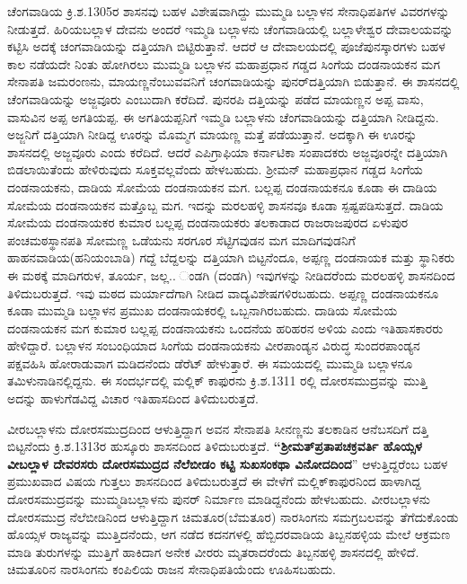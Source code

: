 ಚೆಂಗವಾಡಿಯ ಕ್ರಿ.ಶ.1305ರ ಶಾಸನವು ಬಹಳ ವಿಶೇಷವಾಗಿದ್ದು ಮುಮ್ಮಡಿ ಬಲ್ಲಾಳನ ಸೇನಾಧಿಪತಿಗಳ ವಿವರಗಳನ್ನು ನೀಡುತ್ತದೆ. ಹಿರಿಯಬಲ್ಲಾಳ ದೇವನು ಅಂದರೆ ಇಮ್ಮಡಿ ಬಲ್ಲಾಳನು ಚೆಂಗವಾಡಿಯಲ್ಲಿ ಬಲ್ಲಾಳೇಶ್ವರ ದೇವಾಲಯವನ್ನು ಕಟ್ಟಿಸಿ ಅದಕ್ಕೆ ಚಂಗವಾಡಿಯನ್ನು ದತ್ತಿಯಾಗಿ ಬಿಟ್ಟಿರುತ್ತಾನೆ. ಆದರೆ ಆ ದೇವಾಲಯದಲ್ಲಿ ಪೂಜೆಪುನಸ್ಕಾರಗಳು ಬಹಳ ಕಾಲ ನಡೆಯದೇ ನಿಂತು ಹೋಗಿರಲು ಮುಮ್ಮಡಿ ಬಲ್ಲಾಳನ ಮಹಾಪ್ರಧಾನ ಗಡ್ಡದ ಸಿಂಗೆಯ ದಂಡನಾಯಕನ ಮಗ ಸೇನಾಪತಿ ಜಮರಂಣನು, ಮಾಯಣ್ಣನೆಂಬುವವನಿಗೆ ಚಂಗವಾಡಿಯನ್ನು ಪುನರ್​ದತ್ತಿಯಾಗಿ ಬಿಡುತ್ತಾನೆ. ಈ ಶಾಸನದಲ್ಲಿ ಚೆಂಗವಾಡಿಯನ್ನು ಅಜ್ಜವೂರು ಎಂಬುದಾಗಿ ಕರೆದಿದೆ. ಪುನರಪಿ ದತ್ತಿಯನ್ನು ಪಡೆದ ಮಾಯಣ್ಣನ ಅಪ್ಪ ವಾಸು, ವಾಸುವಿನ ಅಪ್ಪ ಅಗತಿಯಪ್ಪ. ಈ ಅಗತಿಯಪ್ಪನಿಗೆ ಇಮ್ಮಡಿ ಬಲ್ಲಾಳನು ಚೆಂಗವಾಡಿಯನ್ನು ದತ್ತಿಯಾಗಿ ನೀಡಿದ್ದನು. ಅಜ್ಜನಿಗೆ ದತ್ತಿಯಾಗಿ ನೀಡಿದ್ದ ಊರನ್ನು ಮೊಮ್ಮಗ ಮಾಯಣ್ಣ ಮತ್ತೆ ಪಡೆಯುತ್ತಾನೆ. ಅದಕ್ಕಾಗಿ ಈ ಊರನ್ನು ಶಾಸನದಲ್ಲಿ ಅಜ್ಜವೂರು ಎಂದು ಕರೆದಿದೆ. ಆದರೆ ಎಪಿಗ್ರಾಫಿಯಾ ಕರ್ನಾಟಿಕಾ ಸಂಪಾದಕರು ಅಜ್ಜವೂರನ್ನೇ ದತ್ತಿಯಾಗಿ ಬಿಡಲಾಯಿತೆಂದು ಹೇಳಿರುವುದು ಸೂಕ್ತವಲ್ಲವೆಂದು ಹೇಳಬಹುದು. ಶ‍್ರೀಮನ್​ ಮಹಾಪ್ರಧಾನ ಗಡ್ಡದ ಸಿಂಗೆಯ ದಂಡನಾಯಕನು, ದಾಡಿಯ ಸೋಮೆಯ ದಂಡನಾಯಕನ ಮಗ. ಬಲ್ಲಪ್ಪ ದಂಡನಾಯಕನೂ ಕೂಡಾ ಈ ದಾಡಿಯ ಸೋಮೆಯ ದಂಡನಾಯಕನ ಮತ್ತೊಬ್ಬ ಮಗ. ಇದನ್ನು ಮರಲಹಳ್ಳಿ ಶಾಸನವೂ ಕೂಡಾ ಸ್ಪಷ್ಟಪಡಿಸುತ್ತದೆ.  ದಾಡಿಯ ಸೋಮೆಯ ದಂಡನಾಯಕರ ಕುಮಾರ ಬಲ್ಲಪ್ಪ ದಂಡನಾಯಕರು ತಲಕಾಡಾದ ರಾಜರಾಜಪುರದ ಏಳುಪುರ ಪಂಚಮಠಸ್ಥಾನಪತಿ ಸೋಮಣ್ಣ ಒಡೆಯನು ಸರಗೂರ ಸೆಟ್ಟಿಗವುಡನ ಮಗ ಮಾದಿಗವುಡನಿಗೆ ಹಾಹನವಾಡಿಯ(ಹನಿಯಂಬಾಡಿ) ಗದ್ದೆ ಬೆದ್ದಲನ್ನು ದತ್ತಿಯಾಗಿ ಬಿಟ್ಟನೆಂದೂ, ಅಪ್ಪಣ್ಣ ದಂಡನಾಯಕ ಮತ್ತು ಸ್ಥಾನಿಕರು ಈ ಮಠಕ್ಕೆ ಮಾದಿಗರುಳ, ತೂರ್ಯ, ಜಲ್ಲ.. ಂಡಗಿ (ದಂಡಗಿ) ಇವುಗಳನ್ನು ನೀಡಿದರೆಂದು ಮರಲಹಳ್ಳಿ ಶಾಸನದಿಂದ ತಿಳಿದುಬರುತ್ತದೆ. ಇವು ಮಠದ ಮರ್ಯಾದೆಗಾಗಿ ನೀಡಿದ ವಾದ್ಯವಿಶೇಷಗಳಿರಬಹುದು. ಅಪ್ಪಣ್ಣ ದಂಡನಾಯಕನೂ ಕೂಡಾ ಮುಮ್ಮಡಿ ಬಲ್ಲಾಳನ ಪ್ರಮುಖ ದಂಡನಾಯಕರಲ್ಲಿ ಒಬ್ಬನಾಗಿರಬಹುದು. ದಾಡಿಯ ಸೋಮೆಯ ದಂಡನಾಯಕನ ಮಗ ಕುಮಾರ ಬಲ್ಲಪ್ಪ ದಂಡನಾಯಕನು ಒಂದನೆಯ ಹರಿಹರನ ಅಳಿಯ ಎಂದು ಇತಿಹಾಸಕಾರರು ಹೇಳಿದ್ದಾರೆ. ಬಲ್ಲಾಳನ ಸಂಬಂಧಿಯಾದ ಸಿಂಗೆಯ ದಂಡನಾಯಕನು ವೀರಪಾಂಡ್ಯನ ವಿರುದ್ಧ ಸುಂದರಪಾಂಡ್ಯನ ಪಕ್ಷವಹಿಸಿ ಹೋರಾಡುವಾಗ ಮಡಿದನೆಂದು ಡೆರೆಟ್​ ಹೇಳುತ್ತಾರೆ. ಈ ಸಮಯದಲ್ಲಿ ಮುಮ್ಮಡಿ ಬಲ್ಲಾಳನೂ ತಮಿಳುನಾಡಿನಲ್ಲಿದ್ದನು. ಈ ಸಂದರ್ಭದಲ್ಲಿ ಮಲ್ಲಿಕ್​ ಕಾಫುರನು ಕ್ರಿ.ಶ.1311 ರಲ್ಲಿ ದೋರಸಮುದ್ರವನ್ನು ಮುತ್ತಿ ಅದನ್ನು ಹಾಳುಗೆಡವಿದ್ದ ವಿಚಾರ ಇತಿಹಾಸದಿಂದ ತಿಳಿದುಬರುತ್ತದೆ. 

ವೀರಬಲ್ಲಾಳನು ದೋರಸಮುದ್ರದಿಂದ ಆಳುತ್ತಿದ್ದಾಗ ಅವನ ಸೇನಾಪತಿ ಸೀನಣ್ಣನು ತಲಕಾಡಿನ ಆನೆಬಸದಿಗೆ ದತ್ತಿ ಬಿಟ್ಟನೆಂದು ಕ್ರಿ.ಶ.1313ರ ಹುಸ್ಕೂರು ಶಾಸನದಿಂದ ತಿಳಿದುಬರುತ್ತದೆ. \textbf{“ಶ‍್ರೀಮತ್​ ಪ್ರತಾಪಚಕ್ರವರ್ತಿ ಹೊಯ್ಸಳ ವೀಬಲ್ಲಾಳ ದೇವರಸರು ದೋರಸಮುದ್ರದ ನೆಲೆಬೀಡಂ ಕಟ್ಟಿ ಸುಖಸಂಕಥಾ ವಿನೋದದಿಂದ}” ಆಳುತ್ತಿದ್ದರೆಂಬ ಬಹಳ ಪ್ರಮುಖ\-ವಾದ ವಿಷಯ ಗುತ್ತಲು ಶಾಸನದಿಂದ ತಿಳಿದುಬರುತ್ತದೆ ಈ ವೇಳೆಗೆ ಮಲ್ಲಿಕ್​ಕಾಫುರನಿಂದ ಹಾಳಾಗಿದ್ದ ದೋರಸಮುದ್ರವನ್ನು ಮುಮ್ಮಡಿಬಲ್ಲಾಳನು ಪುನರ್​ ನಿರ್ಮಾಣ ಮಾಡಿದ್ದನೆಂದು ಹೇಳಬಹುದು. ವೀರಬಲ್ಲಾಳನು ದೋರಸಮುದ್ರ ನೆಲೆಬೀಡಿನಿಂದ ಆಳುತ್ತಿದ್ದಾಗ ಚಿಮತೂರ(ಬೆಮತೂರ) ನಾರಸಿಂಗನು ಸಮಗ್ರಬಲವನ್ನು ತೆಗೆದುಕೊಂಡು ಹೊಯ್ಸಳ ರಾಜ್ಯವನ್ನು ಮುತ್ತಿದನೆಂದು, ಆಗ ನಡೆದ ಕದನಗಳಲ್ಲಿ ಹೆಬ್ಬಿದರವಾಡಿಯ ತಿಬ್ಬನಹಳ್ಳಿಯ ಮೇಲೆ ಆಕ್ರಮಣ ಮಾಡಿ ತುರುಗಳನ್ನು ಮುತ್ತಿಗೆ ಹಾಕಿದಾಗ ಅನೇಕ ವೀರರು ಮೃತರಾದರೆಂದು ತಿಬ್ಬನಹಳ್ಳಿ ಶಾಸನದಲ್ಲಿ ಹೇಳಿದೆ. ಚಿಮತೂರಿನ ನಾರಸಿಂಗನು ಕಂಪಿಲಿಯ ರಾಜನ ಸೇನಾಧಿಪತಿಯೆಂದು ಊಹಿಸಬಹುದು. 

